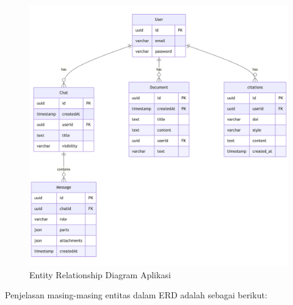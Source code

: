 \begin{figure}[H]
  \centering
  \includegraphics[width=0.95\linewidth]{images/bab-3/erd-skripsi.png}
  \caption{Entity Relationship Diagram Aplikasi}
  \label{fig:erd}
\end{figure}

\noindent Penjelasan masing-masing entitas dalam ERD adalah sebagai berikut:

